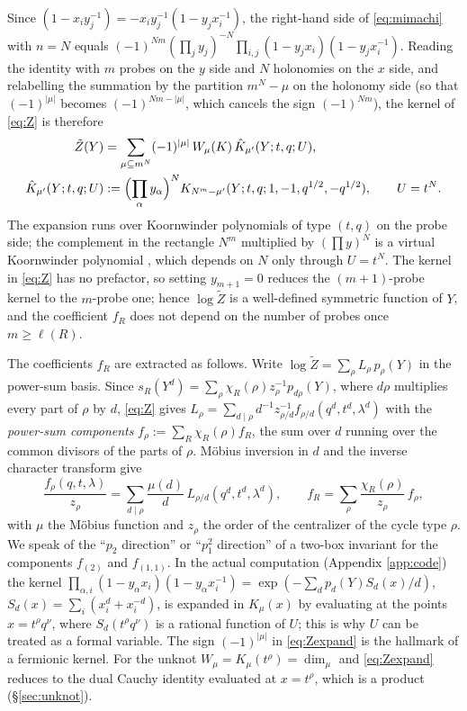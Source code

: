 Since $(1 - x_iy_j^{-1}) = -x_iy_j^{-1}(1 - y_jx_i^{-1})$, the right-hand side of \eqref{eq:mimachi} with $n = N$ equals $(-1)^{Nm}(\prod_j y_j)^{-N}\prod_{i,j}(1 - y_jx_i)(1 - y_jx_i^{-1})$. Reading the identity with $m$ probes on the $y$ side and $N$ holonomies on the $x$ side, and relabelling the summation by the partition $m^N - \mu$ on the holonomy side (so that $(-1)^{|\mu|}$ becomes $(-1)^{Nm - |\mu|}$, which cancels the sign $(-1)^{Nm}$), the kernel of \eqref{eq:Z} is therefore
\begin{equation}\label{eq:Zexpand}
\begin{aligned}
\tilde Z(Y) &= \sum_{\mu \subseteq m^N} (-1)^{|\mu|}\, W_\mu(K)\, \hat K_{\mu'}(Y; t, q; U),\\
\hat K_{\mu'}(Y; t, q; U) &:= \Bigl(\prod_\alpha y_\alpha\Bigr)^N K_{N^m - \mu'}(Y; t, q; 1, -1, q^{1/2}, -q^{1/2}),\qquad U = t^N.
\end{aligned}
\end{equation}
The expansion runs over Koornwinder polynomials of type $(t, q)$ on the probe side; the complement in the rectangle $N^m$ multiplied by $(\prod y)^N$ is a virtual Koornwinder polynomial \cite{Rains05,RW21}, which depends on $N$ only through $U = t^N$. The kernel in \eqref{eq:Z} has no prefactor, so setting $y_{m+1} = 0$ reduces the $(m+1)$-probe kernel to the $m$-probe one; hence $\log\tilde Z$ is a well-defined symmetric function of $Y$, and the coefficient $f_R$ does not depend on the number of probes once $m \ge \ell(R)$.

The coefficients $f_R$ are extracted as follows. Write $\log\tilde Z = \sum_\rho L_\rho\, p_\rho(Y)$ in the power-sum basis. Since $s_R(Y^d) = \sum_\rho \chi_R(\rho) z_\rho^{-1} p_{d\rho}(Y)$, where $d\rho$ multiplies every part of $\rho$ by $d$, \eqref{eq:Z} gives $L_\rho = \sum_{d \mid \rho} d^{-1} z_{\rho/d}^{-1} f_{\rho/d}(q^d, t^d, \lambda^d)$ with the \emph{power-sum components} $f_\rho := \sum_R \chi_R(\rho) f_R$, the sum over $d$ running over the common divisors of the parts of $\rho$. M\"obius inversion in $d$ and the inverse character transform give
\begin{equation}\label{eq:extract}
\frac{f_\rho(q,t,\lambda)}{z_\rho} = \sum_{d \mid \rho} \frac{\mu(d)}{d}\, L_{\rho/d}(q^d, t^d, \lambda^d),\qquad
f_R = \sum_\rho \frac{\chi_R(\rho)}{z_\rho}\, f_\rho ,
\end{equation}
with $\mu$ the M\"obius function and $z_\rho$ the order of the centralizer of the cycle type $\rho$. We speak of the ``$p_2$ direction'' or ``$p_1^2$ direction'' of a two-box invariant for the components $f_{(2)}$ and $f_{(1,1)}$.
In the actual computation (Appendix \ref{app:code}) the kernel $\prod_{\alpha,i}(1 - y_\alpha x_i)(1 - y_\alpha x_i^{-1}) = \exp(-\sum_d p_d(Y)S_d(x)/d)$, $S_d(x) = \sum_i(x_i^d + x_i^{-d})$, is expanded in $K_\mu(x)$ by evaluating at the points $x = t^\rho q^\nu$, where $S_d(t^\rho q^\nu)$ is a rational function of $U$; this is why $U$ can be treated as a formal variable. The sign $(-1)^{|\mu|}$ in \eqref{eq:Zexpand} is the hallmark of a fermionic kernel. For the unknot $W_\mu = K_\mu(t^\rho) = \dim_\mu$ and \eqref{eq:Zexpand} reduces to the dual Cauchy identity evaluated at $x = t^\rho$, which is a product (\S\ref{sec:unknot}).

